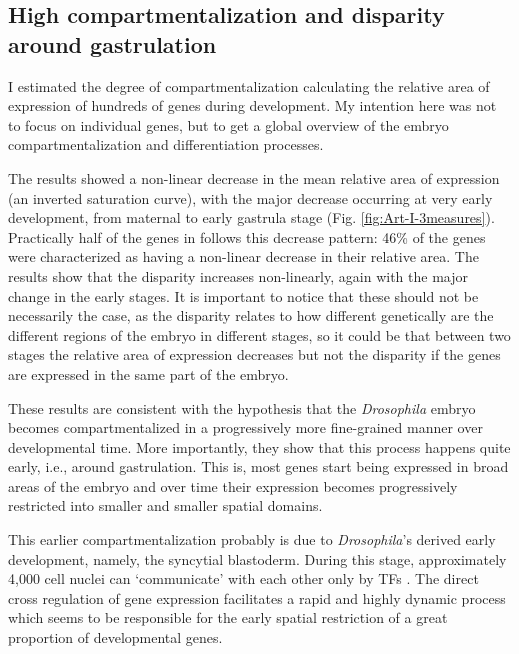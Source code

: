 \subsection{High compartmentalization and disparity around gastrulation}
I estimated the degree of compartmentalization calculating the relative area of expression of hundreds of genes during development.
My intention here was not to focus on individual genes, but to get a global overview of the embryo compartmentalization and differentiation processes.

The results showed a non-linear decrease in the mean relative area of expression (an inverted saturation curve), with the major decrease occurring at very early development, from maternal to early gastrula stage (Fig. \ref{fig:Art-I-3measures}).
Practically half of the genes in follows this decrease pattern: 46\% of the genes were characterized as having a non-linear decrease in their relative area.
The results show that the disparity increases non-linearly, again with the major change in the early stages.
%
It is important to notice that these should not be necessarily the case, as the disparity relates to how different genetically are the different regions of the embryo in different stages, so it could be that between two stages the relative area of expression decreases but not the disparity if the genes are expressed in the same part of the embryo.


These results are consistent with the hypothesis that the \textit{Drosophila} embryo becomes compartmentalized in a progressively more fine-grained manner over developmental time. 
More importantly, they show that this process happens quite early, i.e., around gastrulation.
This is, most genes start being expressed in broad areas of the embryo and over time their expression becomes progressively restricted into smaller and smaller spatial domains.

This earlier compartmentalization probably is due to \textit{Drosophila}'s derived early development, namely, the syncytial blastoderm. During this stage, approximately 4,000 cell nuclei can `communicate' with each other only by TFs \citep{Jaeger2011}. The direct cross regulation of gene expression facilitates a rapid and highly dynamic process which seems to be responsible for the early spatial restriction of a great proportion of developmental genes.

